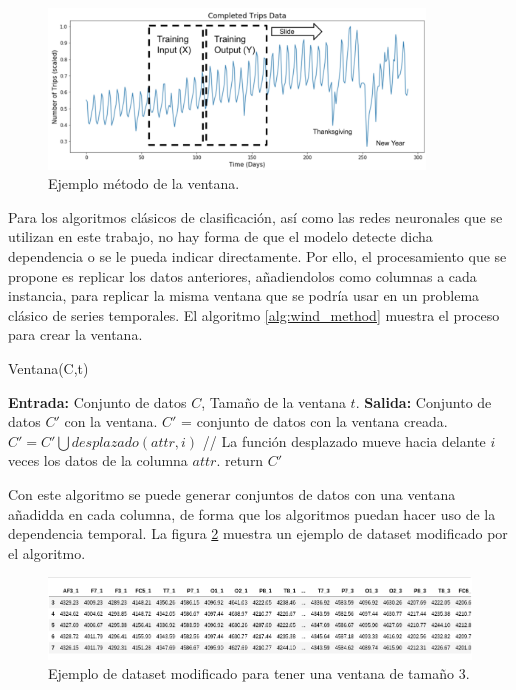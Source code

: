 \begin{figure}[H]
	\centering
	\includegraphics[width=100mm]{imagenes/sliding_window_ts.png}
	\caption{Ejemplo método de la ventana.}
	\label{fig:52}
\end{figure}
\verticalspace

Para los algoritmos clásicos de clasificación, así como las redes neuronales que se utilizan en este trabajo, no hay forma de que el modelo detecte dicha dependencia o se le pueda indicar directamente. Por ello, el procesamiento que se propone es replicar los datos anteriores, añadiendolos como columnas a cada instancia, para replicar la misma ventana que se podría usar en un problema clásico de series temporales. El algoritmo \ref{alg:wind_method} muestra el proceso para crear la ventana.\newline

\begin{algorithm}[H]
	\caption{Ventana(C,t)}
	\label{alg:wind_method}
	\begin{algorithmic}[0]
		\State \textbf{Entrada:} Conjunto de datos $C$, Tamaño de la ventana $t$.
		\State \textbf{Salida:} Conjunto de datos $C'$ con la ventana.
		\State $C'$ = conjunto de datos con la ventana creada.
				\State $C' = C' \bigcup desplazado(attr,i)$ // La función desplazado mueve hacia delante $i$ veces los datos de la columna $attr$.
			\EndFor
		\EndFor
		\State return $C'$
	\end{algorithmic}
\end{algorithm}
\verticalspace

Con este algoritmo se puede generar conjuntos de datos con una ventana añadidda en cada columna, de forma que los algoritmos puedan hacer uso de la dependencia temporal. La figura \ref{fig:53} muestra un ejemplo de dataset modificado por el algoritmo.\newline

\begin{figure}[H]
	\centering
	\includegraphics[width=130mm]{imagenes/ventana.png}
	\caption{Ejemplo de dataset modificado para tener una ventana de tamaño 3.}
	\label{fig:53}
\end{figure}
\verticalspace

